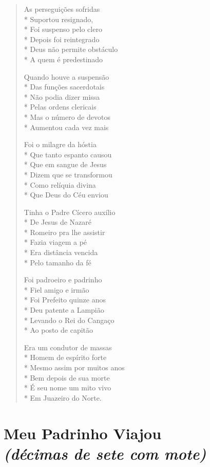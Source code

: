 \begin{verse}
As perseguições sofridas\\*
Suportou resignado,\\*
Foi suspenso pelo clero\\*
Depois foi reintegrado\\*
Deus não permite obstáculo\\*
A quem é predestinado

Quando houve a suspensão\\*
Das funções sacerdotais\\*
Não podia dizer missa\\*
Pelas ordens clericais\\*
Mas o número de devotos\\*
Aumentou cada vez mais

Foi o milagre da hóstia\\*
Que tanto espanto causou\\*
Que em sangue de Jesus\\*
Dizem que se transformou\\*
Como relíquia divina\\*
Que Deus do Céu enviou

Tinha o Padre Cícero auxílio\\*
De Jesus de Nazaré\\*
Romeiro pra lhe assistir\\*
Fazia viagem a pé\\*
Era distância vencida\\*
Pelo tamanho da fé

Foi padroeiro e padrinho\\*
Fiel amigo e irmão\\*
Foi Prefeito quinze anos\\*
Deu patente a Lampião\\*
Levando o Rei do Cangaço\\*
Ao posto de capitão

Era um condutor de massas\\*
Homem de espírito forte\\*
Mesmo assim por muitos anos\\*
Bem depois de sua morte\\*
É seu nome um mito vivo\\*
Em Juazeiro do Norte.
\end{verse}


\chapter[Meu Padrinho Viajou]{Meu Padrinho Viajou\\\smallskip\textit{(décimas de sete com mote)}}

